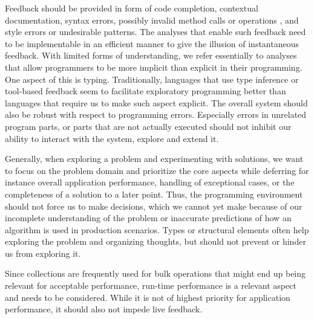 \documentclass[sigconf, 10pt]{acmart}
\begin{document}
Feedback should be provided in form of
code completion, contextual documentation,
syntax errors, possibly invalid method calls or operations ,
and style errors or undesirable patterns.
The analyses that enable such feedback need to be implementable
in an efficient manner to give the illusion of instantaneous feedback.
%
With limited forms of understanding,
we refer essentially to analyses
that allow programmers to be more implicit than explicit in their programming.
One aspect of this is typing.
Traditionally, languages that use type inference
or tool-based feedback seem to facilitate exploratory programming better
than languages that require us to make such aspect explicit.
%   
The overall system should also be robust with respect to programming errors.
Especially errors in unrelated program parts,
or parts that are not actually executed
should not inhibit our ability to interact with the system,
explore and extend it.

Generally, when exploring a problem and experimenting with solutions,
we want to focus on the problem domain and prioritize the core aspects
while deferring for instance overall application performance,
handling of exceptional cases,
or the completeness of a solution to a later point.
Thus, the programming environment should not force us to make decisions,
which we cannot yet make because of our incomplete understanding of the problem
or inaccurate predictions of how an algorithm is used in production scenarios.
Types or structural elements often help exploring
the problem and organizing thoughts,
but should not prevent or hinder us from exploring it.

Since collections are frequently used for bulk operations
that might end up being relevant for acceptable performance,
run-time performance is a relevant aspect and needs to be considered.
While it is not of highest priority for application performance,
it should also not impede live feedback.
\end{document}
